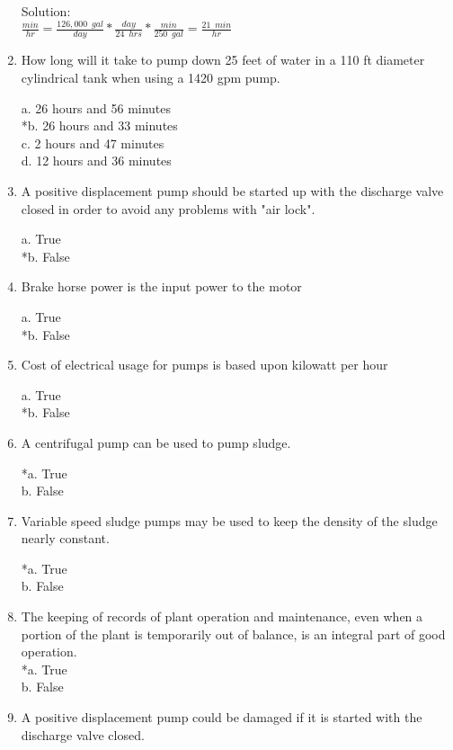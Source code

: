 \begin{enumerate}
\vspace{0.3cm}
Solution:\\
\vspace{0.2cm}
$\frac{min}{hr}=\frac{126,000 \enspace gal}{day}*\frac{day}{24 \enspace hrs}*\frac{min}{250 \enspace gal}=\boxed{\frac{21 \enspace min}{hr}}$



\item  How long will it take to pump down 25 feet of water in a 110 ft diameter cylindrical tank when using a 1420 gpm pump. 

a. 26 hours and 56 minutes \\
*b. 26 hours and 33 minutes \\
c. 2 hours and 47 minutes \\
d. 12 hours and 36 minutes 


\item  A positive displacement pump should be started up with the discharge valve closed in order to avoid any problems with "air lock". 

a. True \\
*b. False 


\item  Brake horse power is the input power to the motor 

a. True \\
*b. False 


\item  Cost of electrical usage for pumps is based upon kilowatt per hour 

a. True \\
*b. False 


\item  A centrifugal pump can be used to pump sludge. 

*a. True \\
b. False 


\item  Variable speed sludge pumps may be used to keep the density of the sludge nearly constant. 

*a. True \\
b. False

\item The keeping of records of plant operation and maintenance, even when a portion of the plant is temporarily out of balance, is an integral part of good operation.\\
*a. True\\
b. False 


\item  A positive displacement pump could be damaged if it is started with the discharge valve closed. \\


\end{enumerate}
